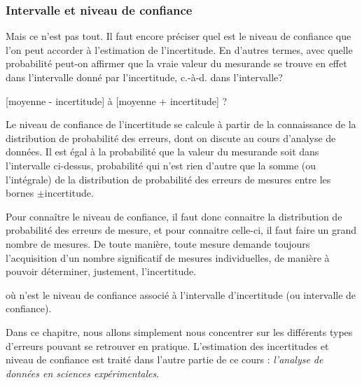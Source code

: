 \newpage

\subsubsection*{Intervalle et niveau de confiance}

Mais ce n'est pas tout. Il faut encore préciser quel est le niveau de confiance que l'on peut accorder à l'estimation de l'incertitude. En d'autres termes, avec quelle probabilité peut-on affirmer que la vraie valeur du mesurande se trouve en effet dans l'intervalle donné par l'incertitude, c.-à-d. dans l'intervalle?
\begin{center}
[moyenne - incertitude] à [moyenne + incertitude] ?
\end{center}
Le niveau de confiance de l'incertitude se calcule à partir de la connaissance de la distribution de probabilité des erreurs, dont on discute au cours d'analyse de données. Il est égal à la probabilité que la valeur du mesurande soit dans l'intervalle ci-dessus, probabilité qui n'est rien d'autre que la somme (ou l'intégrale) de la distribution de probabilité des erreurs de mesures entre les bornes $\pm$incertitude.

Pour connaître le niveau de confiance, il faut donc connaitre la distribution de probabilité des erreurs de mesure, et pour connaitre celle-ci, il faut faire un grand nombre de mesures. De toute manière, toute mesure demande toujours l'acquisition d'un nombre significatif de mesures individuelles, de manière à pouvoir déterminer, justement, l'incertitude.

\begin{center}
\end{center}
où n'est le niveau de confiance associé à l'intervalle d'incertitude (ou intervalle de confiance).


Dans ce chapitre, nous allons simplement nous concentrer sur les différents types d'erreurs pouvant se retrouver en pratique. L'estimation des incertitudes et niveau de confiance est traité dans l'autre partie de ce cours : \textit{l'analyse de données en sciences expérimentales}.

